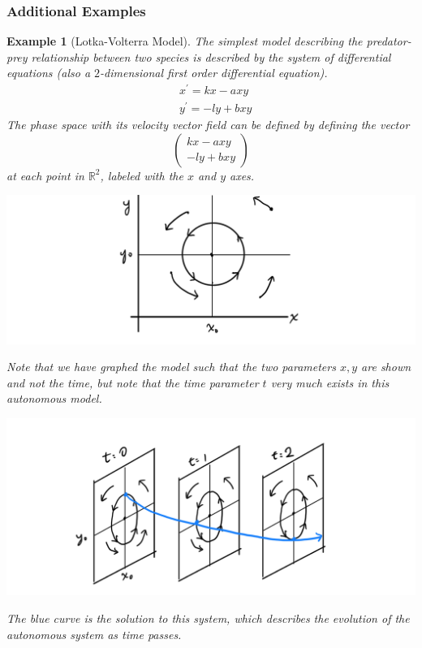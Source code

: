 \documentclass{article}
\newtheorem{example}{Example}[section]
\theoremstyle{remark}
\theoremstyle{definition}
\begin{document}
\subsubsection{Additional Examples}
\begin{example}[Lotka-Volterra Model]
The simplest model describing the predator-prey relationship between two species is described by the system of differential equations (also a $2$-dimensional first order differential equation). 
\begin{align*}
    & x^\prime = k x - a x y \\
    & y^\prime = - l y + b x y
\end{align*} 
The phase space with its velocity vector field can be defined by defining the vector 
\[\begin{pmatrix}
kx - axy \\ -ly + bxy
\end{pmatrix}\]
at each point in $\mathbb{R}^2$, labeled with the $x$ and $y$ axes. 
\begin{center}
    \includegraphics[scale=0.25]{img/Lotka_Volterra.PNG}
\end{center}
Note that we have graphed the model such that the two parameters $x, y$ are shown and not the time, but note that the time parameter $t$ very much exists in this autonomous model. 
\begin{center}
    \includegraphics[scale=0.25]{img/Lotka_Autonomous.PNG}
\end{center}
The blue curve is the solution to this system, which describes the evolution of the autonomous system as time passes. 
\end{example}
\end{document}
